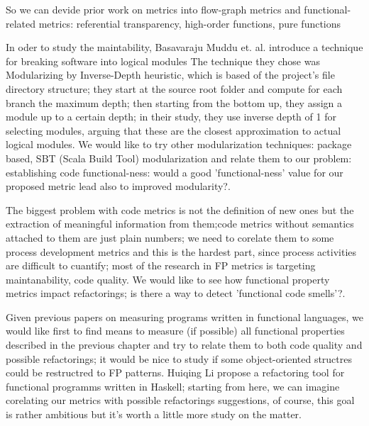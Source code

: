 \documentclass{article}
\begin{document}
So we can devide prior work on metrics into flow-graph metrics and functional-related metrics: referential transparency, high-order functions, pure functions\cite{DBLP:conf/icse/MudduABP13} \par


In oder to study the maintability, Basavaraju Muddu et. al. introduce a technique for breaking software into logical modules \cite{DBLP:conf/icse/MudduABP13} The technique they chose was Modularizing by  Inverse-Depth heuristic, which is based of the project's file directory structure; they start at the source root folder and compute for each branch the maximum depth; then starting from the bottom up, they assign a module up to a certain depth; in their study, they use inverse depth of 1 for selecting modules, arguing that these are the closest approximation to actual logical modules. We would like to try other modularization techniques: package based, SBT (Scala Build Tool)  modularization and relate them to our problem: establishing code functional-ness: would a good 'functional-ness' value for our proposed metric lead also to improved modularity?.\par

The biggest problem with code metrics is not the definition of new ones but the extraction of  meaningful information from them;code metrics without semantics attached to them are just plain numbers; we need to corelate them to some process development metrics and this is the hardest part, since process activities are difficult to cuantify; most of the research in FP metrics is targeting maintanability, code quality. We would like to see how functional property metrics impact refactorings; is there a way to detect 'functional code smells'?.  \par

Given previous papers on measuring programs written in functional languages, we would like first to find means to measure (if possible) all functional properties described in the previous chapter and try to relate them to both code quality and possible refactorings; it would be nice to study if some object-oriented structres could be restructred to FP patterns. Huiqing Li propose a refactoring tool for functional programms written in Haskell\cite{Li:2003:TSR:871895.871899}; starting from here, we can imagine corelating our metrics with possible refactorings suggestions, of course, this goal is rather ambitious but it's worth a little more study on the matter.
\end{document}
